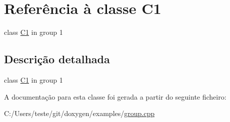 \hypertarget{class_c1}{\section{Referência à classe C1}
\label{class_c1}
}


class \hyperlink{class_c1}{C1} in group 1  




\subsection{Descrição detalhada}
class \hyperlink{class_c1}{C1} in group 1 

A documentação para esta classe foi gerada a partir do seguinte ficheiro\-:\begin{DoxyCompactItemize}
\item 
C\-:/\-Users/teste/git/doxygen/examples/\hyperlink{group_8cpp}{group.\-cpp}\end{DoxyCompactItemize}
